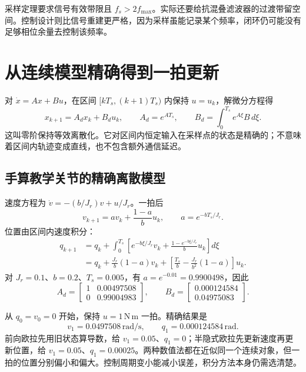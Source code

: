 采样定理要求信号有效带限且 $f_s>2f_{\max}$。实际还要给抗混叠滤波器的过渡带留空间。控制设计则比信号重建更严格，因为采样虽能记录某个频率，闭环仍可能没有足够相位余量去控制该频率。

\section{从连续模型精确得到一拍更新}

对 $\dot x=Ax+Bu$，在区间 $[kT_s,(k+1)T_s)$ 内保持 $u=u_k$，解微分方程得
\begin{equation}
x_{k+1}=A_dx_k+B_du_k,
\qquad A_d=e^{AT_s},\qquad
B_d=\int_0^{T_s}e^{A\xi}B\,d\xi.
\label{eq:cf_zoh_exact}
\end{equation}
这叫零阶保持等效离散化。它对区间内恒定输入在采样点的状态是精确的；不意味着区间内轨迹变成直线，也不包含额外通信延迟。

\subsection{手算教学关节的精确离散模型}

速度方程为 $\dot v=-(b/J_r)v+u/J_r$。一拍后
\[
v_{k+1}=a v_k+\frac{1-a}{b}u_k,
\qquad a=e^{-bT_s/J_r}.
\]
位置由区间内速度积分：
\begin{align}
q_{k+1}
&=q_k+\int_0^{T_s}
\left[e^{-b\xi/J_r}v_k+\frac{1-e^{-b\xi/J_r}}b u_k\right]d\xi\\
&=q_k+\frac{J_r}{b}(1-a)v_k
+\left[\frac{T_s}{b}-\frac{J_r}{b^2}(1-a)\right]u_k.
\end{align}
对 $J_r=0.1$、$b=0.2$、$T_s=0.005$，有 $a=e^{-0.01}=0.9900498$，因此
\begin{equation}
A_d=\begin{bmatrix}1&0.00497508\\0&0.99004983\end{bmatrix},
\qquad B_d=\begin{bmatrix}0.000124584\\0.04975083\end{bmatrix}.
\end{equation}

\begin{examplebox}[算例 13B 相同一拍用三种积分方法会怎样]
从 $q_0=v_0=0$ 开始，保持 $u=1\,\mathrm{N\,m}$ 一拍。精确结果是
\[
v_1=0.0497508\,\mathrm{rad/s},\qquad
q_1=0.000124584\,\mathrm{rad}.
\]
前向欧拉先用旧状态算导数，给 $v_1=0.05$、$q_1=0$；半隐式欧拉先更新速度再更新位置，给 $v_1=0.05$、$q_1=0.00025$。两种数值法都在近似同一个连续对象，但一拍的位置分别偏小和偏大。控制周期变小能减小误差，积分方法本身仍需选清楚。
\end{examplebox}

